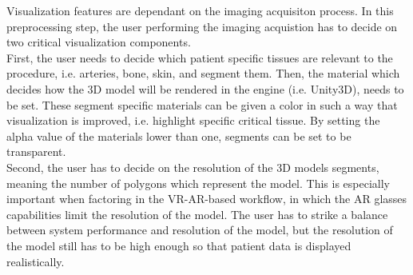 Visualization features are dependant on the imaging acquisiton process.
In this preprocessing step, the user performing the imaging acquistion has to decide on two critical visualization components.
\\ First, the user needs to decide which patient specific tissues are relevant to the procedure, i.e. arteries, bone, skin, and segment them.
Then, the material which decides how the 3D model will be rendered in the engine (i.e. Unity3D), needs to be set.
These segment specific materials can be given a color in such a way that visualization is improved, i.e. highlight specific critical tissue.
By setting the alpha value of the materials lower than one, segments can be set to be transparent.
\\ Second, the user has to decide on the resolution of the 3D models segments, meaning the number of polygons which represent the model.
This is especially important when factoring in the VR-AR-based workflow, in which the AR glasses capabilities limit the resolution of the model.
The user has to strike a balance between system performance and resolution of the model, but the resolution of the model still has to be high enough so that patient data is displayed realistically.

